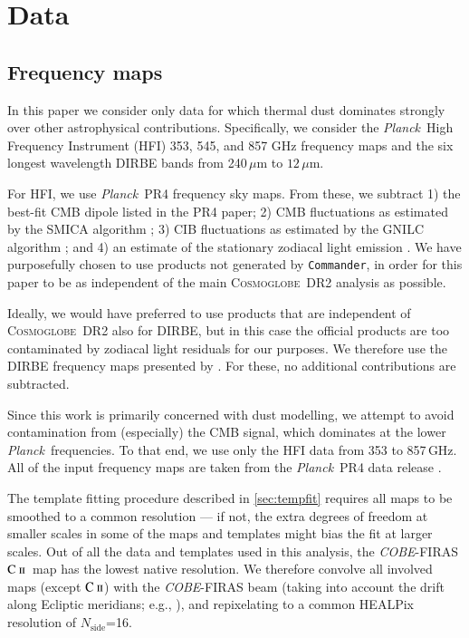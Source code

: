 \documentclass{aa}
\newcommand{\mathsc}[1]{{\normalfont\textsc{#1}}}
\def\Cosmoglobe{\textsc{Cosmoglobe}}
\def\Planck{\textit{Planck}}
\def\COBE{\textit{COBE}}
\def\nside{$N_{\mathrm{side}}$}
\newcommand{\CII}{\ensuremath{\mathsc{C\ ii}}}
\def\commander{\texttt{Commander}}
\begin{document}
\section{Data}
\label{sec:data}

\subsection{Frequency maps}

In this paper we consider only data for which thermal dust dominates
strongly over other astrophysical contributions. Specifically, we
consider the \Planck\ High Frequency Instrument (HFI) 353, 545, and
857 GHz frequency maps \citep{planck2016-l03} and the six longest
wavelength DIRBE bands from 240\,$\mu\mathrm m$ to $12\,\mu\mathrm m$.

For HFI, we use \Planck\ PR4 \citep{npipe} frequency sky maps. From
these, we subtract 1) the best-fit CMB dipole listed in the PR4 paper;
2) CMB fluctuations as estimated by the SMICA algorithm
\citep{planck2016-l04}; 3) CIB fluctuations as estimated by the GNILC
algorithm \citep{planck2016-XLVIII}; and 4) an estimate of the
stationary zodiacal light emission \citep{planck2013-pip88}. We have
purposefully chosen to use products not generated by \commander, in
order for this paper to be as independent of the main \Cosmoglobe\ DR2
analysis as possible.

Ideally, we would have preferred to use products that are independent
of \Cosmoglobe\ DR2 also for DIRBE, but in this case the official
products are too contaminated by zodiacal light residuals for our
purposes. We therefore use the DIRBE frequency maps presented by
\citet{CG02_01}. For these, no additional
contributions are subtracted.

Since this work is primarily concerned with dust modelling, we attempt to avoid
contamination from (especially) the CMB signal, which dominates at the
lower \Planck\ frequencies. To that end, we use only the HFI data from
353 to 857\,GHz. All of the input frequency maps are taken from the \Planck\ PR4 data release
\citep{npipe}.

The template fitting procedure described in \cref{sec:tempfit}
requires all maps to be smoothed to a common resolution --- if not, the
extra degrees of freedom at smaller scales in some of the maps and
templates might bias the fit at larger scales. Out of all the data and
templates used in this analysis, the \COBE-FIRAS \CII\ map has the lowest native resolution. We therefore convolve all involved
maps (except \CII) with the \COBE-FIRAS beam (taking
into account the drift along Ecliptic meridians; e.g., \citealp{odegard:2019}), and repixelating to a common HEALPix
resolution of \nside=16.
\end{document}

